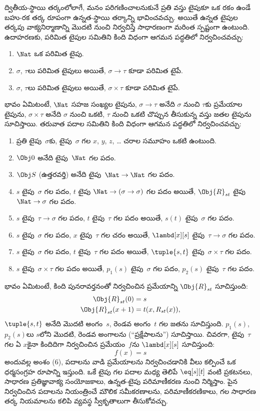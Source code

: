 \documentclass[../../../include/open-logic-section]{subfiles}
\begin{document}
ద్వితీయ-స్థాయి తర్కంలోలాగే, మనం పరిగణించాలనుకునే ప్రతి వస్తు టైపుకూ
ఒక రకం ఉండే బహు-రక తర్క రూపంగా ఉన్నత-స్థాయి తర్కాన్ని భావించవచ్చు.
అయితే ఉన్నత టైపుల తర్కపు వాక్యనిర్మాణాన్ని మొదటి నుంచి నిర్వచిస్తే
సాధారణంగా మరింత స్పష్టంగా ఉంటుంది. ఉదాహరణకు, పరిమిత టైపుల సమితిని కింది విధంగా
ఆగమన పద్ధతిలో నిర్వచించవచ్చు:
\begin{enumerate}
\item $\Nat$ ఒక పరిమిత టైపు.
\item $\sigma$, $\tau$లు పరిమిత టైపులు అయితే, $\sigma
  \to \tau$ కూడా పరిమిత టైపే.
\item $\sigma$, $\tau$లు పరిమిత టైపులు అయితే, $\sigma \times
  \tau$ కూడా పరిమిత టైపే.
\end{enumerate}
భావం ఏమిటంటే, $\Nat$ సహజ సంఖ్యల టైపును,
$\sigma \to \tau$ అనేది $\sigma$ నుంచి $\tau$కు ప్రమేయాల టైపును,
$\sigma \times \tau$ అనేది $\sigma$ నుంచి ఒకటి, $\tau$ నుంచి ఒకటి
చొప్పున తీసుకున్న వస్తు జతల టైపును సూచిస్తాయి. తరువాత పదాల సమితిని
కింది విధంగా ఆగమన పద్ధతిలో నిర్వచించవచ్చు:
\begin{enumerate}
\item ప్రతి టైపు~$\sigma$కు, టైపు~$\sigma$ గల $x$, $y$, $z$, \dots
  చరాల సమూహం ఒకటి ఉంటుంది.
\item $\Obj 0$ అనేది టైపు~$\Nat$ గల పదం.
\item $\Obj S$ (ఉత్తరవర్తి) అనేది టైపు~$\Nat \to \Nat$ గల పదం.
\item $s$ టైపు~$\sigma$ గల పదం, $t$ టైపు
  $\Nat \to (\sigma \to \sigma)$ గల పదం అయితే, $\Obj{R}_{st}$ టైపు
  $\Nat \to \sigma$ గల పదం.
\item $s$ టైపు~$\tau \to \sigma$ గల పదం, $t$ టైపు~$\tau$ గల పదం
  అయితే, $s(t)$ టైపు~$\sigma$ గల పదం.
\item $s$ టైపు~$\sigma$ గల పదం, $x$ టైపు~$\tau$ గల చరం అయితే,
  $\lambd[x][s]$ టైపు~$\tau \to \sigma$ గల పదం.
\item $s$ టైపు~$\sigma$ గల పదం, $t$ టైపు~$\tau$ గల పదం అయితే,
  $\tuple{s, t}$ టైపు~$\sigma \times \tau$ గల పదం.
\item $s$ టైపు~$\sigma \times \tau$ గల పదం అయితే, $p_1(s)$
  టైపు~$\sigma$ గల పదం, $p_2(s)$ టైపు~$\tau$ గల పదం.
\end{enumerate}
భావం ఏమిటంటే, కింది పునరావర్తనంతో నిర్వచించిన ప్రమేయాన్ని
$\Obj{R}_{st}$ సూచిస్తుంది:
\begin{align*}
\Obj{R}_{st}(0) & = s \\
\Obj{R}_{st}(x+1) & = t(x, R_{st}(x)),
\end{align*}
$\tuple{s, t}$ అనేది మొదటి అంగం~$s$, రెండవ అంగం~$t$ గల జతను
సూచిస్తుంది. $p_1(s)$, $p_2(s)$లు $s$లోని మొదటి, రెండవ అంగాలను
(``ప్రక్షేపాలను'') సూచిస్తాయి. చివరగా, టైపు~$\tau$ గల ఏ $x$కైనా
కిందిదిగా నిర్వచించిన ప్రమేయం~$f$ను $\lambd[x][s]$ సూచిస్తుంది:
\[
f(x) = s
\]
అందువల్ల అంశం (6), పదాలను వాడి ప్రమేయాలను నిర్వచించడానికి వీలు
కల్పించే ఒక ధర్మసంగ్రహ రూపాన్ని ఇస్తుంది.
ఒకే టైపు గల పదాల మధ్య  తెలిపే $\eq[s][t]$ వంటి ప్రకటనలు, సాధారణ
ప్రతిజ్ఞావాక్య సంయోజకాలు, ఉన్నత-టైపు పరిమాణీకరణ నుంచి
 నిర్మిస్తాం. పైన నిర్వచించిన పదాలను నియంత్రించే
మౌలిక సమీకరణాలను, పరిమాణీకరణికాలు,  గల సాధారణ తర్క
నియమాలను కలిపి వ్యవస్థ స్వీకృతాలుగా తీసుకోవచ్చు.
\end{document}
